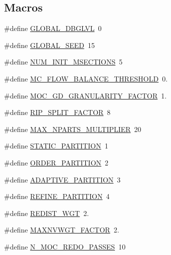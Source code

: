\subsection*{Macros}
\begin{DoxyCompactItemize}
\item 
\#define \hyperlink{a00894_a99fab6a0815d872567df4fdeae6b460f}{G\+L\+O\+B\+A\+L\+\_\+\+D\+B\+G\+L\+VL}~0
\item 
\#define \hyperlink{a00894_a010baa0f89ee42eb93a4a1cef5d5d735}{G\+L\+O\+B\+A\+L\+\_\+\+S\+E\+ED}~15
\item 
\#define \hyperlink{a00894_a83a6667543012cbd026e68f28d03dc01}{N\+U\+M\+\_\+\+I\+N\+I\+T\+\_\+\+M\+S\+E\+C\+T\+I\+O\+NS}~5
\item 
\#define \hyperlink{a00894_aeda2161a20e072eb1fd28d883896b7e1}{M\+C\+\_\+\+F\+L\+O\+W\+\_\+\+B\+A\+L\+A\+N\+C\+E\+\_\+\+T\+H\+R\+E\+S\+H\+O\+LD}~0.
\item 
\#define \hyperlink{a00894_ae655d9906ac99efbaaf4f7aa09f99e5c}{M\+O\+C\+\_\+\+G\+D\+\_\+\+G\+R\+A\+N\+U\+L\+A\+R\+I\+T\+Y\+\_\+\+F\+A\+C\+T\+OR}~1.
\item 
\#define \hyperlink{a00894_a49290a333527146354d3bcf6694e508a}{R\+I\+P\+\_\+\+S\+P\+L\+I\+T\+\_\+\+F\+A\+C\+T\+OR}~8
\item 
\#define \hyperlink{a00894_a0fcba7f938fc4842287570c8532dbd0f}{M\+A\+X\+\_\+\+N\+P\+A\+R\+T\+S\+\_\+\+M\+U\+L\+T\+I\+P\+L\+I\+ER}~20
\item 
\#define \hyperlink{a00894_a441c3e33ba47186f2e1ed0c74c17e113}{S\+T\+A\+T\+I\+C\+\_\+\+P\+A\+R\+T\+I\+T\+I\+ON}~1
\item 
\#define \hyperlink{a00894_a9dbd67f42db39dd166cf3edcc68ecde9}{O\+R\+D\+E\+R\+\_\+\+P\+A\+R\+T\+I\+T\+I\+ON}~2
\item 
\#define \hyperlink{a00894_a0ce405c623e3960361d7dc982e4db789}{A\+D\+A\+P\+T\+I\+V\+E\+\_\+\+P\+A\+R\+T\+I\+T\+I\+ON}~3
\item 
\#define \hyperlink{a00894_afd20ca384873e7849dd2f5e8bd69a8ba}{R\+E\+F\+I\+N\+E\+\_\+\+P\+A\+R\+T\+I\+T\+I\+ON}~4
\item 
\#define \hyperlink{a00894_a33f14f6e7375a4b8168ddea9adfaca25}{R\+E\+D\+I\+S\+T\+\_\+\+W\+GT}~2.
\item 
\#define \hyperlink{a00894_a06f9ffa399c34881133ac03bd1375960}{M\+A\+X\+N\+V\+W\+G\+T\+\_\+\+F\+A\+C\+T\+OR}~2.
\item 
\#define \hyperlink{a00894_afe0468acefc0170fa27aadbda39e73e8}{N\+\_\+\+M\+O\+C\+\_\+\+R\+E\+D\+O\+\_\+\+P\+A\+S\+S\+ES}~10
\item 

\end{DoxyCompactItemize}
